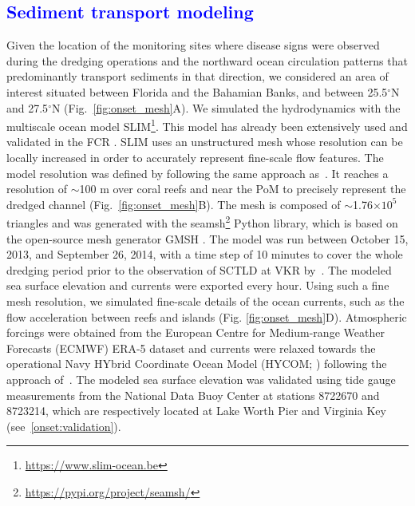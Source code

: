 \documentclass[preprint,12pt,authoryear]{elsarticle}
\newcommand{\modif}[1]{\textcolor{blue}{#1}}
\begin{document}
\modif{\subsection{Sediment transport modeling}}

Given the location of the monitoring sites where disease signs were observed during the dredging operations and the northward ocean circulation patterns that predominantly transport sediments in that direction, we considered an area of interest situated between Florida and the Bahamian Banks, and between 25.5$^\circ$N and 27.5$^\circ$N (Fig.~\ref{fig:onset_mesh}A). We simulated the hydrodynamics with the multiscale ocean model SLIM\footnote{\url{ https://www.slim-ocean.be}}. This model has already been extensively used and validated in the FCR \citep{frys2020fine,dobbelaere2020coupled,dobbelaere2022impacts,dobbelaere2022connecting}. SLIM uses an unstructured mesh whose resolution can be locally increased in order to accurately represent fine-scale flow features. The model resolution was defined by following the same approach as~\citep{dobbelaere2020coupled}. It reaches a resolution of $\sim$100 m over coral reefs and near the PoM to precisely represent the dredged channel (Fig.~\ref{fig:onset_mesh}B). The mesh is composed of $\sim$1.76$\times 10^5$ triangles and was generated with the seamsh\footnote{\url{https://pypi.org/project/seamsh/}} Python library, which is based on the open-source mesh generator GMSH \citep{geuzaine2009gmsh}. The model was run between October 15, 2013, and September 26, 2014, with a time step of 10 minutes to cover the whole dredging period prior to the observation of SCTLD at VKR by~\cite{precht2016unprecedented}. The modeled sea surface elevation and currents were exported every hour. Using such a fine mesh resolution, we simulated fine-scale details of the ocean currents, such as the flow acceleration between reefs and islands (Fig. \ref{fig:onset_mesh}D). Atmospheric forcings were obtained from the European Centre for Medium-range Weather Forecasts (ECMWF) ERA-5 dataset and currents were relaxed towards the operational Navy HYbrid Coordinate Ocean Model (HYCOM; \citealp{chassignet2007hycom}) following the approach of~\cite{dobbelaere2022impacts}. The modeled sea surface elevation was validated using tide gauge measurements from the National Data Buoy Center at stations 8722670 and 8723214, which are respectively located at Lake Worth Pier and Virginia Key (see~\ref{onset:validation}).
\end{document}
